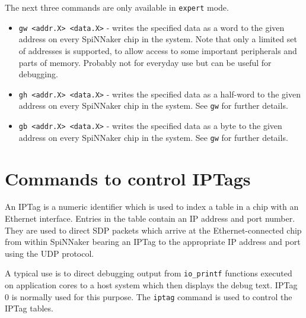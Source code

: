 The next three commands are only available in \texttt{expert} mode.

\begin{itemize}

\item
\texttt{gw <addr.X> <data.X>} - writes the specified data as a word
to the given address on every SpiNNaker chip in the system. Note that
only a limited set of addresses is supported, to allow access to some
important peripherals and parts of memory. Probably not for everyday
use but can be useful for debugging.

\item
\texttt{gh <addr.X> <data.X>} - writes the specified data as a half-word
to the given address on every SpiNNaker chip in the system. See \texttt{gw}
for further details.

\item
\texttt{gb <addr.X> <data.X>} - writes the specified data as a byte
to the given address on every SpiNNaker chip in the system. See \texttt{gw}
for further details.


\end{itemize}

\section{Commands to control IPTags}

An IPTag is a numeric identifier which is used to index a table in
a chip with an Ethernet interface. Entries in the table contain an
IP address and port number. They are used to direct SDP packets which
arrive at the Ethernet-connected chip from within SpiNNaker bearing an
IPTag to the appropriate IP address and port using the UDP protocol.

A typical use is to direct debugging output from \texttt{io\_printf}
functions executed on application cores to a host system which then
displays the debug text. IPTag 0 is normally used for this purpose.
The \texttt{iptag} command is used to control the IPTag tables.

